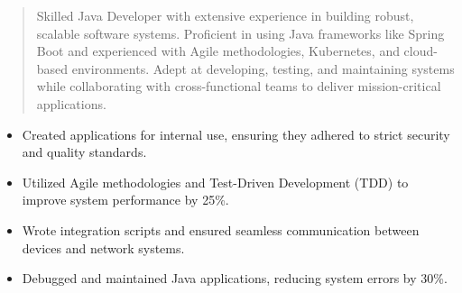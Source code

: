 



\makecvheader

\begin{quote}
  \noindent
  Skilled Java Developer with extensive experience in building robust, scalable software systems. Proficient in using Java frameworks like Spring Boot and experienced with Agile methodologies, Kubernetes, and cloud-based environments. Adept at developing, testing, and maintaining systems while collaborating with cross-functional teams to deliver mission-critical applications.
\end{quote}

\par\smallskip
\noindent
\begin{minipage}{20cm}
  \begin{minipage}{9.75cm}
    \begin{itemize}
      \item Created applications for internal use, ensuring they adhered to strict security and quality standards.
      \item Utilized Agile methodologies and Test-Driven Development (TDD) to improve system performance by 25\%.
    \end{itemize}
  \end{minipage}
  \hfill
  \begin{minipage}{9.75cm}
    \begin{itemize}
      \item Wrote integration scripts and ensured seamless communication between devices and network systems.
      \item Debugged and maintained Java applications, reducing system errors by 30\%.
    \end{itemize}
  \end{minipage}
\end{minipage}
\par\smallskip
\divider

